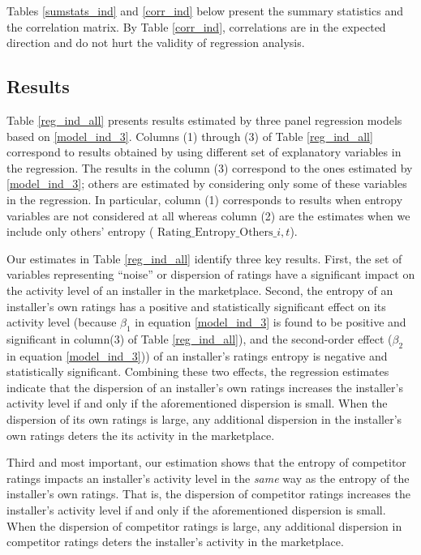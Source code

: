\documentclass[msom,blindrev]{informs3}
\begin{document}
Tables \ref{sumstats_ind} and \ref{corr_ind} below present the summary statistics and the correlation matrix. By Table \ref{corr_ind}, correlations are in the expected direction and do not hurt the validity of regression analysis.





\subsection{Results}

Table \ref{reg_ind_all} presents results estimated by three panel regression models based on \eqref{model_ind_3}. Columns (1) through (3) of Table \ref{reg_ind_all} correspond to results obtained by using different set of explanatory variables in the regression. The results in the column (3) correspond to the ones estimated by \eqref{model_ind_3}; others are estimated by considering only some of these variables in the regression. In particular, column (1) corresponds to results when entropy variables are not considered at all whereas column (2) are the estimates when we include only others' entropy ( $\text{Rating\_Entropy\_Others}\_{i,t}$).




Our estimates in Table \ref{reg_ind_all} identify three key results. First, the set of variables representing ``noise'' or dispersion of ratings have a significant impact on the activity level of an installer in the marketplace. Second, the entropy of an installer's own ratings has a positive and statistically significant effect on its activity level (because $\beta_{1}$ in equation \eqref{model_ind_3} is found to be positive and significant in column(3) of Table \ref{reg_ind_all}), and the second-order effect ($\beta_{2}$ in equation \eqref{model_ind_3})) of an installer's ratings entropy is negative and statistically significant. Combining these two effects, the regression estimates indicate that the dispersion of an installer's own ratings increases the installer's activity level if and only if the aforementioned dispersion is small. When the dispersion of its own ratings is large, any additional dispersion in the installer's own ratings deters the its activity in the marketplace.

Third and most important, our estimation shows that the entropy of competitor ratings impacts an installer's activity level in the \emph{same} way as the entropy of the installer's own ratings. That is, the dispersion of competitor ratings increases the installer's activity level if and only if the aforementioned dispersion is small. When the dispersion of competitor ratings is large, any additional dispersion in competitor ratings deters the installer's activity in the marketplace.
\end{document}
